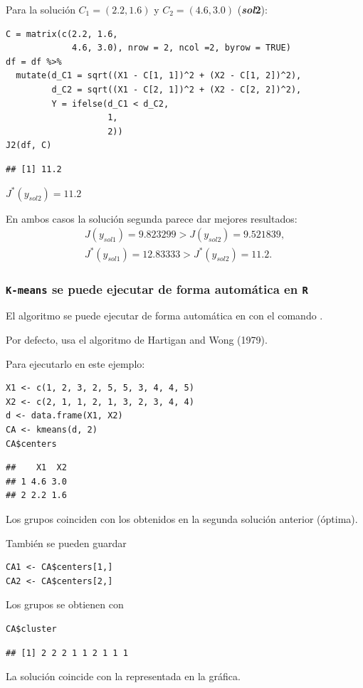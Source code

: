 Para la solución $C_1=(2.2,1.6)$ y $C_2=(4.6,3.0)$ (\textbf{\textit{sol}2}):
\begin{lstlisting}
C = matrix(c(2.2, 1.6,
             4.6, 3.0), nrow = 2, ncol =2, byrow = TRUE)
df = df %>%
  mutate(d_C1 = sqrt((X1 - C[1, 1])^2 + (X2 - C[1, 2])^2),
         d_C2 = sqrt((X1 - C[2, 1])^2 + (X2 - C[2, 2])^2),
         Y = ifelse(d_C1 < d_C2,
                    1,
                    2))
J2(df, C)
\end{lstlisting}
\begin{verbatim}
## [1] 11.2
\end{verbatim}
$J^*(y_{sol2})=11.2$

En ambos casos la solución segunda parece dar mejores resultados: \[ \begin{array}{c}
J(y_{sol1})=9.823299>J(y_{sol2})=9.521839,\\
J^*(y_{sol1})=12.83333>J^*(y_{sol2})=11.2.
\end{array} \]
\subsubsection{\textbf{\texttt{K-means}} se puede ejecutar de forma automática en \textbf{\texttt{R}}}

El algoritmo  se puede ejecutar de forma automática en  con el comando .

Por defecto, usa el algoritmo de Hartigan and Wong (1979).

Para ejecutarlo en este ejemplo:
\begin{lstlisting}
X1 <- c(1, 2, 3, 2, 5, 5, 3, 4, 4, 5)
X2 <- c(2, 1, 1, 2, 1, 3, 2, 3, 4, 4)
d <- data.frame(X1, X2)
CA <- kmeans(d, 2)
CA$centers
\end{lstlisting}
\begin{verbatim}
##    X1  X2
## 1 4.6 3.0
## 2 2.2 1.6
\end{verbatim}
Los grupos coinciden con los obtenidos en la segunda solución anterior (óptima).

También se pueden guardar
\begin{lstlisting}
CA1 <- CA$centers[1,]
CA2 <- CA$centers[2,]
\end{lstlisting}
Los grupos se obtienen con 
\begin{lstlisting}
CA$cluster
\end{lstlisting}
\begin{verbatim}
## [1] 2 2 2 1 1 2 1 1 1
\end{verbatim}
La solución coincide con la representada en la gráfica.

